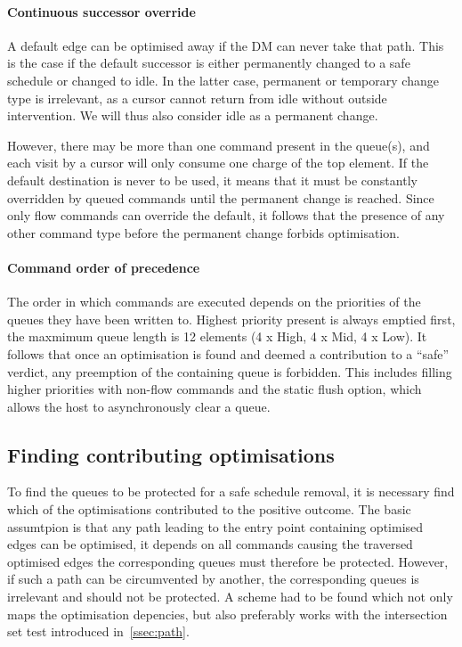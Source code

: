 \paragraph{Continuous successor override}
A default edge can be optimised away if the DM can never take that path. This is the case if the default successor is either permanently changed to a safe schedule or changed to idle. In the latter case, permanent or temporary change type is irrelevant, as a cursor cannot return from idle without outside intervention. We will thus also consider idle as a permanent change.
\par
However, there may be more than one command present in the queue(s), and each visit by a cursor will only consume one charge of the top element. If the default destination is never to be used, it means that it must be constantly overridden by queued commands until the permanent change is reached. Since only flow commands can override the default, it follows that the presence of any other command type before the permanent change forbids optimisation.

\paragraph{Command order of precedence}
The order in which commands are executed depends on the priorities of the queues they have been written to. Highest priority present is always emptied first, the maxmimum queue length is 12 elements (4 x High, 4 x Mid, 4 x Low). It follows that once an optimisation is found and deemed a contribution to a \enquote{safe} verdict, any preemption of the containing queue is forbidden. This includes filling higher priorities with non-flow commands
and the static flush option, which allows the host to asynchronously clear a queue.


\subsection{Finding contributing optimisations}
To find the queues to be protected for a safe schedule removal, it is necessary find which of the optimisations contributed to the positive outcome.
The basic assumtpion is that any path leading to the entry point containing optimised edges can be optimised, it depends on all commands causing the traversed optimised edges the corresponding queues must therefore be protected. However, if such a path can be circumvented by another, the corresponding queues is irrelevant and should not be protected. A scheme had to be found which not only maps the optimisation depencies,
but also preferably works with the intersection set test introduced in~\ref{ssec:path}.

